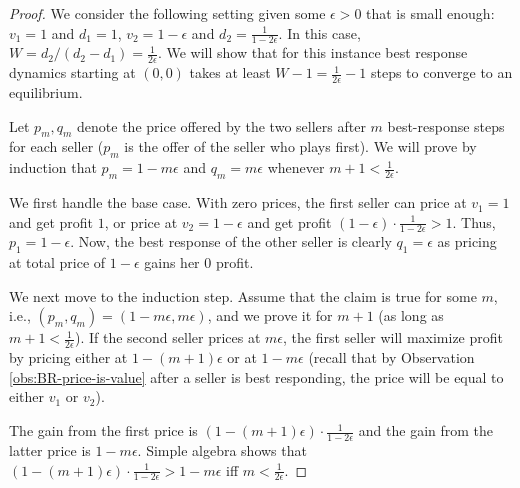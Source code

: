 \begin{proof}
We consider the following setting given some $\epsilon>0$ that is small enough:
$v_1=1$ and $d_1=1$, $v_2=1-\epsilon$ and $d_2=\frac{1}{1-2\epsilon}$.
In this case, $W=d_2/(d_2-d_1)=\frac{1}{2\epsilon}$. We will show that for this instance best response dynamics starting at $(0,0)$
 takes at least $W-1=\frac{1}{2\epsilon}-1$ steps to converge to an equilibrium. %

Let $p_m,q_m$ denote the price offered by the two sellers after $m$ best-response steps for each seller ($p_m$ is the offer of the seller who plays first).
We will prove by induction that $p_m=1-m\epsilon$ and $q_m=m\epsilon$ whenever $m+1 < \frac{1}{2\epsilon}$.


We first handle the base case. With zero prices, the first seller can price at $v_1=1$ and get profit $1$, or price at $v_2= 1-\epsilon$ and get profit
$(1-\epsilon)\cdot \frac{1}{1-2\epsilon} >1$. Thus, $p_1=1-\epsilon$.
Now, the best response of the other seller is clearly $q_1=\epsilon$ as
pricing at total price of $1-\epsilon$ gains her $0$ profit.

We next move to the induction step. Assume that the claim is true for some $m$, i.e., $(p_m,q_m)=(1-m\epsilon, m\epsilon)$, and we prove it for $m+1$
(as long as $m+1<\frac{1}{2\epsilon}$).
If the second seller prices at $m\epsilon$, the first seller will maximize profit by pricing either at $1-(m+1)\epsilon$  or at  $1-m\epsilon$ (recall that
by Observation \ref{obs:BR-price-is-value} after a seller is best responding, the price will be equal to either $v_1$ or $v_2$).

The gain from the first price is $(1-(m+1)\epsilon)\cdot \frac{1}{1-2\epsilon}$ and the gain from the latter price is $1-m\epsilon$.
Simple algebra shows that $(1-(m+1)\epsilon)\cdot \frac{1}{1-2\epsilon} > 1-m\epsilon$ iff $m<\frac{1}{2\epsilon}$.


\end{proof}

